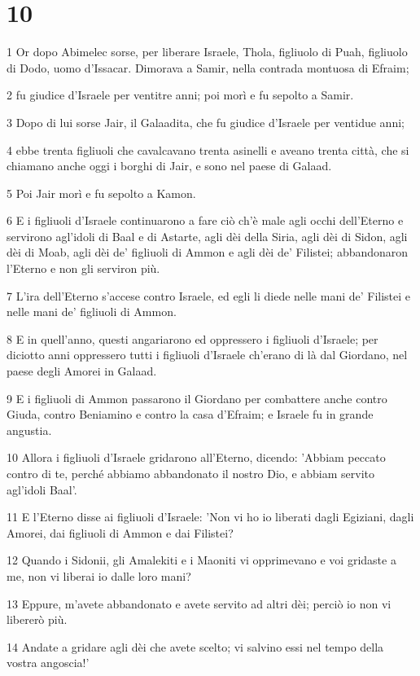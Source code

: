 \chapter{10}

\par 1 Or dopo Abimelec sorse, per liberare Israele, Thola, figliuolo di Puah, figliuolo di Dodo, uomo d'Issacar. Dimorava a Samir, nella contrada montuosa di Efraim;
\par 2 fu giudice d'Israele per ventitre anni; poi morì e fu sepolto a Samir.
\par 3 Dopo di lui sorse Jair, il Galaadita, che fu giudice d'Israele per ventidue anni;
\par 4 ebbe trenta figliuoli che cavalcavano trenta asinelli e aveano trenta città, che si chiamano anche oggi i borghi di Jair, e sono nel paese di Galaad.
\par 5 Poi Jair morì e fu sepolto a Kamon.
\par 6 E i figliuoli d'Israele continuarono a fare ciò ch'è male agli occhi dell'Eterno e servirono agl'idoli di Baal e di Astarte, agli dèi della Siria, agli dèi di Sidon, agli dèi di Moab, agli dèi de' figliuoli di Ammon e agli dèi de' Filistei; abbandonaron l'Eterno e non gli serviron più.
\par 7 L'ira dell'Eterno s'accese contro Israele, ed egli li diede nelle mani de' Filistei e nelle mani de' figliuoli di Ammon.
\par 8 E in quell'anno, questi angariarono ed oppressero i figliuoli d'Israele; per diciotto anni oppressero tutti i figliuoli d'Israele ch'erano di là dal Giordano, nel paese degli Amorei in Galaad.
\par 9 E i figliuoli di Ammon passarono il Giordano per combattere anche contro Giuda, contro Beniamino e contro la casa d'Efraim; e Israele fu in grande angustia.
\par 10 Allora i figliuoli d'Israele gridarono all'Eterno, dicendo: 'Abbiam peccato contro di te, perché abbiamo abbandonato il nostro Dio, e abbiam servito agl'idoli Baal'.
\par 11 E l'Eterno disse ai figliuoli d'Israele: 'Non vi ho io liberati dagli Egiziani, dagli Amorei, dai figliuoli di Ammon e dai Filistei?
\par 12 Quando i Sidonii, gli Amalekiti e i Maoniti vi opprimevano e voi gridaste a me, non vi liberai io dalle loro mani?
\par 13 Eppure, m'avete abbandonato e avete servito ad altri dèi; perciò io non vi libererò più.
\par 14 Andate a gridare agli dèi che avete scelto; vi salvino essi nel tempo della vostra angoscia!'

